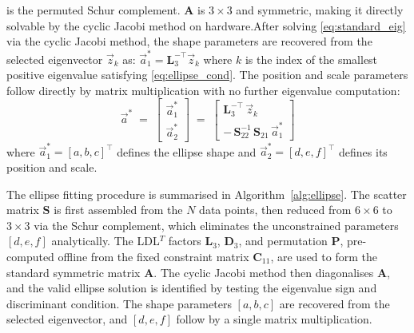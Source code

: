 \documentclass[colorlinks,upint,subscriptcorrection,varvw,hyphenate,balance,greek,russian,vietnamese,german]{asmeconf} %
\newcommand{\vect}[1]{\vec{#1}}
\begin{document}
is the permuted Schur complement.
$\mathbf{A}$ is $3\times3$ and symmetric, making it directly solvable by the cyclic Jacobi method on hardware.After solving \eqref{eq:standard_eig} via the cyclic Jacobi method, the shape parameters are recovered from the selected eigenvector
$\vect{z}_k$ as:
$\vect{a}_1^* = \mathbf{L}_3^{-\top}\vect{z}_k$
where $k$ is the index of the smallest positive eigenvalue
satisfying \eqref{eq:ellipse_cond}.
The position and scale parameters follow directly by matrix multiplication with no further eigenvalue computation:
\begin{equation}
	\vect{a}^* \;=\;
	\begin{bmatrix}
		\vect{a}_1^* \\[4pt]
		\vect{a}_2^*
	\end{bmatrix}
	\;=\;
	\begin{bmatrix}
		\mathbf{L}_3^{-\top}\,\vect{z}_k \\[4pt]
		-\,\mathbf{S}_{22}^{-1}\,\mathbf{S}_{21}\,\vect{a}_1^*
	\end{bmatrix}
	\label{eq:final}
\end{equation}
where $\vect{a}_1^* = [a,b,c]^\top$ defines the ellipse shape
and $\vect{a}_2^* = [d,e,f]^\top$ defines its position and scale.

The ellipse fitting procedure is summarised in
Algorithm~\ref{alg:ellipse}.
The scatter matrix $\mathbf{S}$ is first assembled
from the $N$ data points, then reduced from $6\times6$
to $3\times3$ via the Schur complement, which eliminates
the unconstrained parameters $[d,e,f]$ analytically.
The LDL$^T$ factors $\mathbf{L}_3$, $\mathbf{D}_3$, and
permutation $\mathbf{P}$, pre-computed offline from the
fixed constraint matrix $\mathbf{C}_{11}$, are used to
form the standard symmetric matrix $\mathbf{A}$.
The cyclic Jacobi method then diagonalises $\mathbf{A}$,
and the valid ellipse solution is identified by testing
the eigenvalue sign and discriminant condition.
The shape parameters $[a,b,c]$ are recovered from the
selected eigenvector, and $[d,e,f]$ follow by a single
matrix multiplication.
\end{document}
